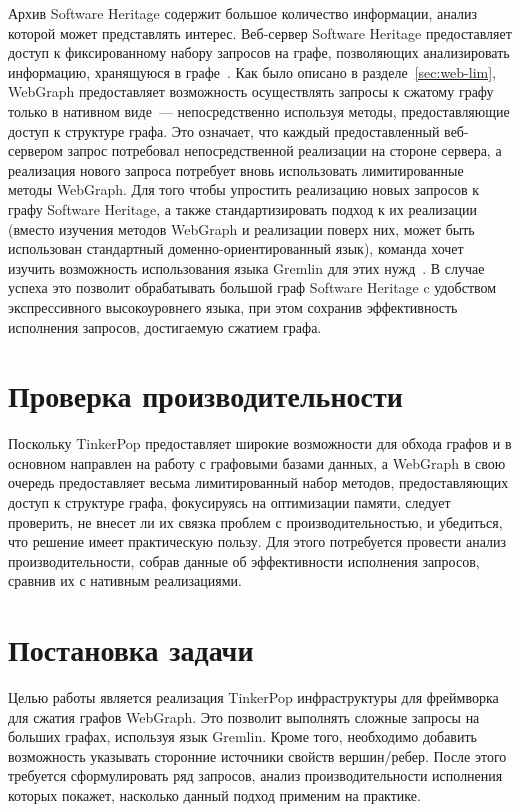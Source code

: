 \documentclass[times,specification,annotation]{itmo-student-thesis}
\begin{document}
Архив Software Heritage содержит большое количество информации, анализ которой может представлять интерес. Веб-сервер Software Heritage предоставляет доступ к фиксированному набору запросов на графе, позволяющих анализировать информацию, хранящуюся в графе~\cite{swh-api}. Как было описано в разделе~\ref{sec:web-lim}, WebGraph предоставляет возможность осуществлять запросы к сжатому графу только в нативном виде~--- непосредственно используя методы, предоставляющие доступ к структуре графа. Это означает, что каждый предоставленный веб-сервером запрос потребовал непосредственной реализации на стороне сервера, а реализация нового запроса потребует вновь использовать лимитированные методы WebGraph. Для того чтобы упростить реализацию новых запросов к графу Software Heritage, а также стандартизировать подход к их реализации (вместо изучения методов WebGraph и реализации поверх них, может быть использован стандартный доменно-ориентированный язык), команда хочет изучить возможность использования языка Gremlin для этих нужд~\cite{swh-intern}. В случае успеха это позволит обрабатывать большой граф Software Heritage c удобством экспрессивного высокоуровнего языка, при этом сохранив эффективность исполнения запросов, достигаемую сжатием графа.

\section{Проверка производительности}

Поскольку TinkerPop предоставляет широкие возможности для обхода графов и в основном направлен на работу с графовыми базами данных, а WebGraph в свою очередь предоставляет весьма лимитированный набор методов, предоставляющих доступ к структуре графа, фокусируясь на оптимизации памяти, следует проверить, не внесет ли их связка проблем с производительностью, и убедиться, что решение имеет практическую пользу. Для этого потребуется провести анализ производительности, собрав данные об эффективности исполнения запросов, сравнив их с нативным реализациями.

\section{Постановка задачи}

Целью работы является реализация TinkerPop инфраструктуры для фреймворка для сжатия графов WebGraph. Это позволит выполнять сложные запросы на больших графах, используя язык Gremlin. Кроме того, необходимо добавить возможность указывать сторонние источники свойств вершин/ребер. После этого требуется сформулировать ряд запросов, анализ производительности исполнения которых покажет, насколько данный подход применим на практике.
\end{document}
